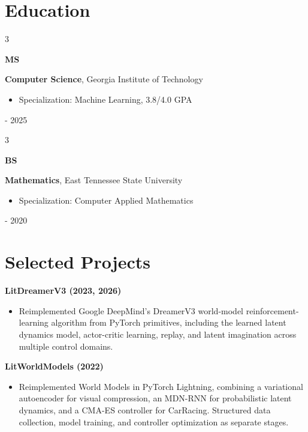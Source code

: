 \documentclass[10pt, letterpaper]{article}
\newenvironment{highlights}{
    \small\linespread{0.96}\selectfont
    \begin{itemize}[
        topsep=0.04 cm,
        parsep=0.02 cm,
        partopsep=0pt,
        itemsep=0pt,
        leftmargin=0.4 cm + 10pt
    ]
}{
    \end{itemize}
}
\newenvironment{threecolentry}[3][]{
    \onecolentry
    \def\thirdColumn{#3}
    \setcolumnwidth{1 cm, \fill, 4.5 cm}
    \begin{paracol}{3}
    {\raggedright #2} \switchcolumn
}{
    \switchcolumn \raggedleft \thirdColumn
    \end{paracol}
    \endonecolentry
}
\begin{document}
    \section{Education}

        \begin{threecolentry}{\textbf{MS}}{
            2021 - 2025
        }
            \textbf{Computer Science}, Georgia Institute of Technology
            \begin{highlights}
                \item {\small Specialization: Machine Learning, 3.8/4.0 GPA}
            \end{highlights}
        \end{threecolentry}

        \vspace{0.3 cm}

        \begin{threecolentry}{\textbf{BS}}{
            2014 - 2020
        }
            \textbf{Mathematics}, East Tennessee State University
            \begin{highlights}
                \item {\small Specialization: Computer Applied Mathematics}
            \end{highlights}

            \vspace{0 cm}
        \end{threecolentry}

    \section{Selected Projects}

        \textbf{LitDreamerV3 (2023, 2026)}
        \begin{highlights}
            \item {\small Reimplemented Google DeepMind’s DreamerV3 world-model reinforcement-learning algorithm from PyTorch primitives,
including the learned latent dynamics model, actor-critic learning, replay, and latent imagination across multiple control
domains.}
        \end{highlights}

        \vspace{0.3 cm}

        \textbf{LitWorldModels (2022)}
        \begin{highlights}
            \item {\small Reimplemented World Models in PyTorch Lightning, combining a variational autoencoder for visual compression, an MDN-RNN for probabilistic latent dynamics, and a CMA-ES controller for CarRacing. Structured data collection, model training, and controller optimization as separate stages.}
        \end{highlights}
\end{document}
